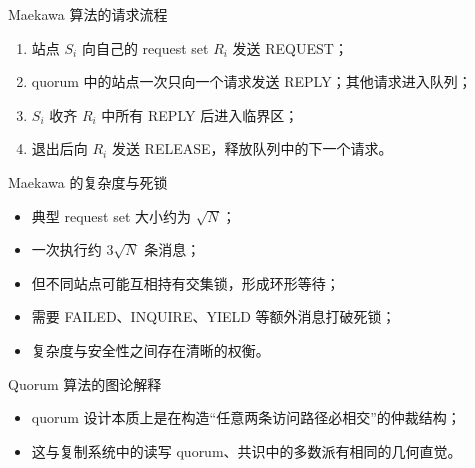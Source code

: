 \documentclass[UTF8,fontset=none,aspectratio=169,10pt]{beamer}
\begin{document}
\begin{frame}{Maekawa 算法的请求流程}
\begin{enumerate}
  \item 站点 $S_i$ 向自己的 request set $R_i$ 发送 REQUEST；
  \item quorum 中的站点一次只向一个请求发送 REPLY；其他请求进入队列；
  \item $S_i$ 收齐 $R_i$ 中所有 REPLY 后进入临界区；
  \item 退出后向 $R_i$ 发送 RELEASE，释放队列中的下一个请求。
\end{enumerate}
\vfill
{}
\end{frame}

\begin{frame}{Maekawa 的复杂度与死锁}
\begin{itemize}
  \item 典型 request set 大小约为 $\sqrt{N}$；
  \item 一次执行约 $3\sqrt{N}$ 条消息；
  \item 但不同站点可能互相持有交集锁，形成环形等待；
  \item 需要 FAILED、INQUIRE、YIELD 等额外消息打破死锁；
  \item 复杂度与安全性之间存在清晰的权衡。
\end{itemize}
\end{frame}

\begin{frame}{Quorum 算法的图论解释}
\begin{center}
\end{center}
\begin{itemize}
  \item quorum 设计本质上是在构造“任意两条访问路径必相交”的仲裁结构；
  \item 这与复制系统中的读写 quorum、共识中的多数派有相同的几何直觉。
\end{itemize}
\end{frame}
\end{document}
